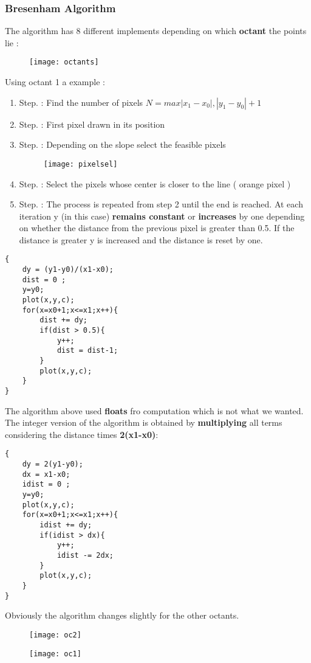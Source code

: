 \subsubsection{Bresenham Algorithm}
The algorithm has 8 different implements depending on which \textbf{octant} the points lie : 
\begin{figure}[H]
 \centering
  \texttt{[image: octants]}
\end{figure}
Using octant 1 a example :
\begin{enumerate}
\item Step. : Find the number of pixels $ N = max{|x_1-x_0|,|y_1-y_0|}+1$
\item Step. : First pixel drawn in its position
\item Step. : Depending on the slope select the feasible pixels
\begin{figure}[H]
 \centering
  \texttt{[image: pixelsel]}
\end{figure}
\item Step. : Select the pixels whose center is closer to the line ( orange pixel )
\item Step. : The process is repeated from step 2 until the end is reached. At each iteration y (in this case) \textbf{remains constant} or \textbf{increases} by one depending on whether the distance from the previous pixel is greater than 0.5. If the distance is greater y is increased and the distance is reset by one.
\end{enumerate}
\begin{lstlisting}
{
	dy = (y1-y0)/(x1-x0);
	dist = 0 ;
	y=y0;
	plot(x,y,c);
	for(x=x0+1;x<=x1;x++){
		dist += dy;
		if(dist > 0.5){
			y++;
			dist = dist-1;
		}
		plot(x,y,c);
	}
}
\end{lstlisting}
The algorithm above used \textbf{floats} fro computation which is not what we wanted.
The integer version of the algorithm is obtained by \textbf{multiplying} all terms considering the distance times \textbf{2(x1-x0)}:
 
\begin{lstlisting}
{
	dy = 2(y1-y0);
	dx = x1-x0;
	idist = 0 ;
	y=y0;
	plot(x,y,c);
	for(x=x0+1;x<=x1;x++){
		idist += dy;
		if(idist > dx){
			y++;
			idist -= 2dx;
		}
		plot(x,y,c);
	}
}
\end{lstlisting}
Obviously the algorithm changes slightly for the other octants.
\begin{figure}[H]
 \centering
  \texttt{[image: oc2]}
\end{figure}
\begin{figure}[H]
 \centering
  \texttt{[image: oc1]}
\end{figure}

